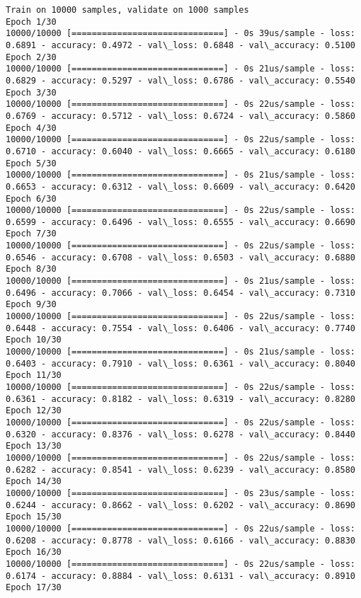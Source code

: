 \documentclass[11pt]{article}
\begin{document}
    \begin{Verbatim}[commandchars=\\\{\}]
Train on 10000 samples, validate on 1000 samples
Epoch 1/30
10000/10000 [==============================] - 0s 39us/sample - loss: 0.6891 - accuracy: 0.4972 - val\_loss: 0.6848 - val\_accuracy: 0.5100
Epoch 2/30
10000/10000 [==============================] - 0s 21us/sample - loss: 0.6829 - accuracy: 0.5297 - val\_loss: 0.6786 - val\_accuracy: 0.5540
Epoch 3/30
10000/10000 [==============================] - 0s 22us/sample - loss: 0.6769 - accuracy: 0.5712 - val\_loss: 0.6724 - val\_accuracy: 0.5860
Epoch 4/30
10000/10000 [==============================] - 0s 22us/sample - loss: 0.6710 - accuracy: 0.6040 - val\_loss: 0.6665 - val\_accuracy: 0.6180
Epoch 5/30
10000/10000 [==============================] - 0s 21us/sample - loss: 0.6653 - accuracy: 0.6312 - val\_loss: 0.6609 - val\_accuracy: 0.6420
Epoch 6/30
10000/10000 [==============================] - 0s 22us/sample - loss: 0.6599 - accuracy: 0.6496 - val\_loss: 0.6555 - val\_accuracy: 0.6690
Epoch 7/30
10000/10000 [==============================] - 0s 22us/sample - loss: 0.6546 - accuracy: 0.6708 - val\_loss: 0.6503 - val\_accuracy: 0.6880
Epoch 8/30
10000/10000 [==============================] - 0s 21us/sample - loss: 0.6496 - accuracy: 0.7066 - val\_loss: 0.6454 - val\_accuracy: 0.7310
Epoch 9/30
10000/10000 [==============================] - 0s 22us/sample - loss: 0.6448 - accuracy: 0.7554 - val\_loss: 0.6406 - val\_accuracy: 0.7740
Epoch 10/30
10000/10000 [==============================] - 0s 21us/sample - loss: 0.6403 - accuracy: 0.7910 - val\_loss: 0.6361 - val\_accuracy: 0.8040
Epoch 11/30
10000/10000 [==============================] - 0s 22us/sample - loss: 0.6361 - accuracy: 0.8182 - val\_loss: 0.6319 - val\_accuracy: 0.8280
Epoch 12/30
10000/10000 [==============================] - 0s 22us/sample - loss: 0.6320 - accuracy: 0.8376 - val\_loss: 0.6278 - val\_accuracy: 0.8440
Epoch 13/30
10000/10000 [==============================] - 0s 22us/sample - loss: 0.6282 - accuracy: 0.8541 - val\_loss: 0.6239 - val\_accuracy: 0.8580
Epoch 14/30
10000/10000 [==============================] - 0s 23us/sample - loss: 0.6244 - accuracy: 0.8662 - val\_loss: 0.6202 - val\_accuracy: 0.8690
Epoch 15/30
10000/10000 [==============================] - 0s 22us/sample - loss: 0.6208 - accuracy: 0.8778 - val\_loss: 0.6166 - val\_accuracy: 0.8830
Epoch 16/30
10000/10000 [==============================] - 0s 22us/sample - loss: 0.6174 - accuracy: 0.8884 - val\_loss: 0.6131 - val\_accuracy: 0.8910
Epoch 17/30

\end{Verbatim}
\end{document}

